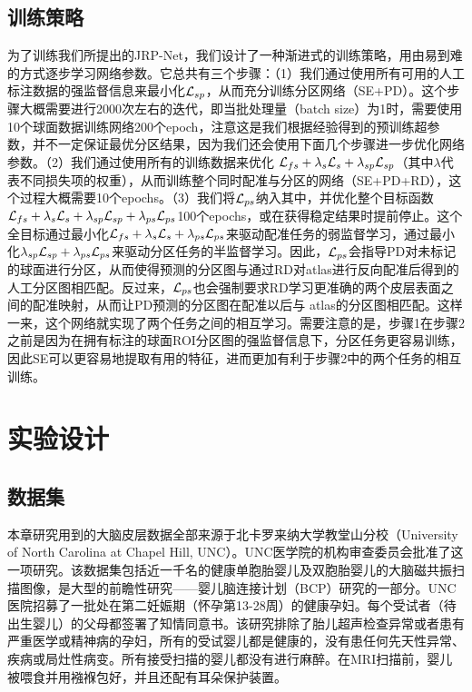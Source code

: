 \subsection{训练策略}
为了训练我们所提出的JRP-Net，我们设计了一种渐进式的训练策略，用由易到难的方式逐步学习网络参数。它总共有三个步骤：（1）我们通过使用所有可用的人工标注数据的强监督信息来最小化${\cal L}_{sp}$，从而充分训练分区网络（SE+PD）。这个步骤大概需要进行2000次左右的迭代，即当批处理量（batch size）为1时，需要使用10个球面数据训练网络200个epoch，注意这是我们根据经验得到的预训练超参数，并不一定保证最优分区结果，因为我们还会使用下面几个步骤进一步优化网络参数。（2）我们通过使用所有的训练数据来优化 ${\cal L}_{fs}+\lambda_s {\cal L}_s+\lambda_{sp}{\cal L}_{sp}$（其中$\lambda$代表不同损失项的权重），从而训练整个同时配准与分区的网络（SE+PD+RD），这个过程大概需要10个epochs。（3）我们将${\cal L}_{ps}$纳入其中，并优化整个目标函数$ {\cal L}_{fs}+\lambda_s{\cal L}_s+\lambda_{sp}{\cal L}_{sp}+\lambda_{ps}{\cal L}_{ps}$100个epochs，或在获得稳定结果时提前停止。这个全目标通过最小化$ {\cal L}_{fs}+\lambda_s{\cal L}_s+\lambda_{ps}{\cal L}_{ps}$来驱动配准任务的弱监督学习，通过最小化$ \lambda_{sp}{\cal L}_{sp}+\lambda_{ps}{\cal L}_{ps}$来驱动分区任务的半监督学习。因此，${\cal L}_{ps}$会指导PD对未标记的球面进行分区，从而使得预测的分区图与通过RD对atlas进行反向配准后得到的人工分区图相匹配。反过来，${\cal L}_{ps}$也会强制要求RD学习更准确的两个皮层表面之间的配准映射，从而让PD预测的分区图在配准以后与
atlas的分区图相匹配。这样一来，这个网络就实现了两个任务之间的相互学习。需要注意的是，步骤1在步骤2之前是因为在拥有标注的球面ROI分区图的强监督信息下，分区任务更容易训练，因此SE可以更容易地提取有用的特征，进而更加有利于步骤2中的两个任务的相互训练。


\section{实验设计}
\subsection{数据集}
本章研究用到的大脑皮层数据全部来源于北卡罗来纳大学教堂山分校（University of North Carolina at Chapel Hill, UNC）。UNC医学院的机构审查委员会批准了这一项研究。该数据集包括近一千名的健康单胞胎婴儿及双胞胎婴儿的大脑磁共振扫描图像，是大型的前瞻性研究——婴儿脑连接计划（BCP）研究的一部分。UNC医院招募了一批处在第二妊娠期（怀孕第13-28周）的健康孕妇。每个受试者（待出生婴儿）的父母都签署了知情同意书。该研究排除了胎儿超声检查异常或者患有严重医学或精神病的孕妇，所有的受试婴儿都是健康的，没有患任何先天性异常、疾病或局灶性病变\cite{gilmore2012longitudinal}。所有接受扫描的婴儿都没有进行麻醉。在MRI扫描前，婴儿被喂食并用襁褓包好，并且还配有耳朵保护装置。

